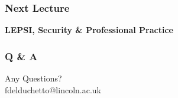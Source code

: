 \documentclass[xcolor=table]{beamer}
\begin{document}

\begin{frame}
    \frametitle{Next Lecture}
    
    
    \begin{center}
        \textbf{LEPSI, Security \& Professional Practice}
    \end{center}
\end{frame}

\begin{frame}
    \frametitle{Q \& A}
    \begin{center}
        \Huge Any Questions?\\\vspace{0.5cm} 
        \normalsize fdelduchetto@lincoln.ac.uk
    \end{center}
\end{frame}
\end{document}
